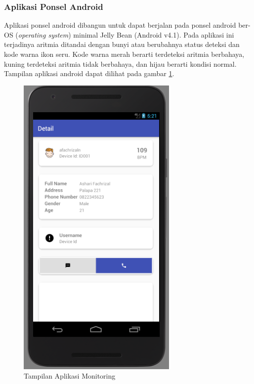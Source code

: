 \subsubsection{Aplikasi Ponsel Android}
Aplikasi ponsel android dibangun untuk dapat berjalan pada ponsel android ber-OS (\textit{operating system}) minimal Jelly Bean (Android v4.1). Pada aplikasi ini terjadinya aritmia ditandai dengan bunyi atau berubahnya status deteksi dan kode warna ikon seru. Kode warna merah berarti terdeteksi aritmia berbahaya, kuning terdeteksi aritmia tidak berbahaya, dan hijau berarti kondisi normal. Tampilan aplikasi android dapat dilihat pada gambar \ref{mobile_app}.

\begin{figure}[H]
	\centering
	\includegraphics[scale=0.5]{images/phone_app.png}
	\caption{Tampilan Aplikasi Monitoring}
	\label{mobile_app}
\end{figure}

